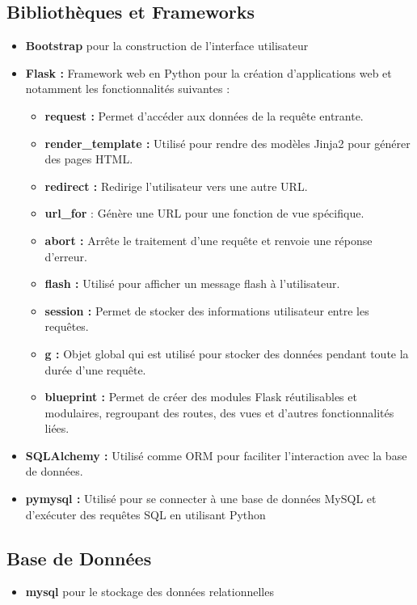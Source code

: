 \subsection{Bibliothèques et Frameworks}
\begin{itemize}
	\item \textbf{Bootstrap} pour la construction de l'interface utilisateur
	\item \textbf{Flask :} Framework web en Python pour la création d'applications web et notamment les fonctionnalités suivantes :
	\begin{itemize}
		\item \textbf{request :} Permet d'accéder aux données de la requête entrante.
		\item \textbf{render_template : }Utilisé pour rendre des modèles Jinja2 pour générer des pages HTML.
		\item \textbf{redirect :} Redirige l'utilisateur vers une autre URL.
		\item \textbf{url_for} : Génère une URL pour une fonction de vue spécifique.
		\item \textbf{abort :} Arrête le traitement d'une requête et renvoie une réponse d'erreur.
		\item \textbf{flash :} Utilisé pour afficher un message flash à l'utilisateur.
		\item \textbf{session :} Permet de stocker des informations utilisateur entre les requêtes.
		\item \textbf{g :} Objet global qui est utilisé pour stocker des données pendant toute la durée d'une requête.
		\item \textbf{blueprint :} Permet de créer des modules Flask réutilisables et modulaires, regroupant des routes, des vues et d'autres fonctionnalités liées.
	\end{itemize}
	\item \textbf{SQLAlchemy :} Utilisé comme ORM pour faciliter l'interaction avec la base de données.
	\item \textbf{pymysql :} Utilisé pour se connecter à une base de données MySQL et d'exécuter des requêtes SQL en utilisant Python
\end{itemize}

\subsection{Base de Données}
\begin{itemize}
	\item \textbf{mysql} pour le stockage des données relationnelles
\end{itemize}

